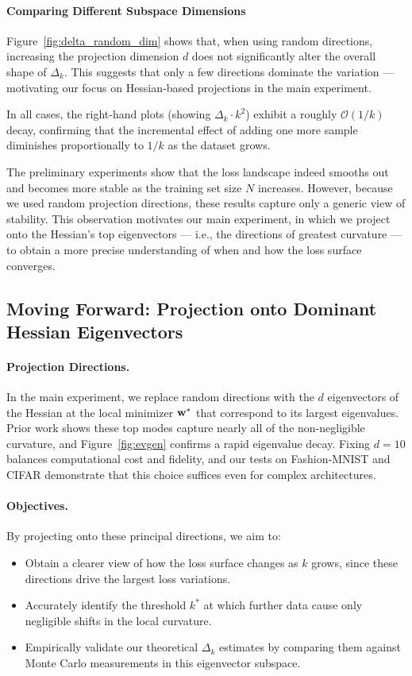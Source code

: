\documentclass{article}
\begin{document}
\paragraph{Comparing Different Subspace Dimensions}
Figure~\ref{fig:delta_random_dim} shows that, when using random directions, increasing the projection dimension $d$ does not
significantly alter the overall shape of $\Delta_k$. This suggests that only a few directions dominate the variation --- motivating our
focus on Hessian‐based projections in the main experiment.

In all cases, the right‐hand plots (showing $\Delta_k \cdot k^2$) exhibit a roughly $\mathcal O(1 / k)$ decay, confirming that the
incremental effect of adding one more sample diminishes proportionally to $1 / k$ as the dataset grows.

The preliminary experiments show that the loss landscape indeed smooths out and becomes more stable as the training set size $N$
increases. However, because we used random projection directions, these results capture only a generic view of stability. This
observation motivates our main experiment, in which we project onto the Hessian’s top eigenvectors --- i.e., the directions of greatest
curvature --- to obtain a more precise understanding of when and how the loss surface converges.

\subsection{Moving Forward: Projection onto Dominant Hessian Eigenvectors}

\paragraph{Projection Directions.}
In the main experiment, we replace random directions with the $d$ eigenvectors of the Hessian at the local minimizer $\mathbf{w}^*$ that
correspond to its largest eigenvalues.  Prior work \cite{sagun2018empirical} shows these top modes capture nearly all of the
non‑negligible curvature, and Figure~\ref{fig:evgen} confirms a rapid eigenvalue decay. Fixing $d=10$ balances computational cost and
fidelity, and our tests on Fashion‑MNIST and CIFAR demonstrate that this choice suffices even for complex architectures.

\paragraph{Objectives.}
By projecting onto these principal directions, we aim to:
\begin{itemize}
  \item Obtain a clearer view of how the loss surface changes as $k$ grows, since these directions drive the largest loss variations.
  \item Accurately identify the threshold $k^*$ at which further data cause only negligible shifts in the local curvature.
  \item Empirically validate our theoretical $\Delta_k$ estimates by comparing them against Monte Carlo measurements in this eigenvector
        subspace.
\end{itemize}
\end{document}
